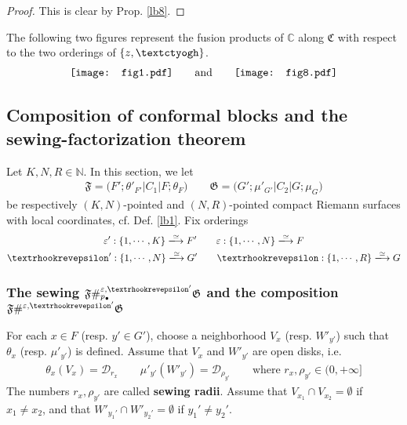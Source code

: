 \documentclass[11pt,b5paper,notitlepage]{article}
\theoremstyle{definition}
\theoremstyle{plain}
\newcommand{\blt}{\bullet}
\newcommand{\Cbb}{\mathbb C}
\newcommand{\Nbb}{\mathbb N}
\newcommand{\<}{\left\langle}
\renewcommand{\>}{\right\rangle}
\newcommand{\MD}{\mathcal{D}}
\newcommand{\fc}{\mathfrak{C}}
\newcommand{\eps}{\varepsilon}
\newcommand{\ff}{\mathfrak{F}}
\newcommand{\fg}{\mathfrak{G}}
\newcommand{\tipaz}{\text{\textctyogh}}
\newcommand{\tipae}{\text{\textrhookrevepsilon}}
\numberwithin{equation}{section}
\begin{document}
\begin{proof}
This is clear by Prop. \ref{lb8}.
\end{proof}


The following two figures represent the fusion products of $\Cbb$ along $\fc$ with respect to the two orderings of $\{z,\tipaz\}$.
\begin{align}\label{eq29}
\vcenter{\hbox{{\texttt{[image: fig1.pdf]}}}}
\qquad\text{and}\qquad
\vcenter{\hbox{{\texttt{[image: fig8.pdf]}}}}
\end{align}


\subsection{Composition of conformal blocks and the sewing-factorization theorem}\label{lb76}

Let $K,N,R\in\Nbb$. In this section, we let 
\begin{gather*}
\ff=\big(F'; \theta'_{F'}\big|C_1\big|F;\theta_F\big)\qquad
\fg=\big(G';\mu'_{G'}\big|C_2\big| G;\mu_G \big)
    \end{gather*}
be respectively $(K,N)$-pointed and $(N,R)$-pointed compact Riemann surfaces with local coordinates, cf. Def. \ref{lb1}. 
Fix orderings
	\begin{gather*}
\eps':\{1,\cdots,K\}\xlongrightarrow{\simeq}F'\qquad	\eps:\{1,\cdots,N\}\xlongrightarrow{\simeq}F\\ \tipae':\{1,\cdots,N\}\xlongrightarrow{\simeq}G'\qquad \tipae:\{1,\cdots,R\}\xlongrightarrow{\simeq}G
	\end{gather*}



\subsubsection{The sewing $\ff\#^{\eps,\tipae'}_{p_\blt}\fg$ and the composition $\ff\#^{\eps,\tipae'}\fg$}\label{lb46}


For each $x\in F$ (resp. $y'\in G'$), choose a neighborhood $V_x$ (resp. $W'_{y'}$) such that $\theta_x$ (resp. $\mu'_{y'}$) is defined. Assume that $V_x$ and $W'_{y'}$ are open disks, i.e.
\begin{align}
\theta_x(V_x)=\MD_{r_x}\qquad \mu'_{y'}(W'_{y'})=\MD_{\rho_{y'}}\qquad\text{where }r_x,\rho_{y'}\in(0,+\infty]
\end{align} 
The numbers $r_x,\rho_{y'}$ are called \textbf{sewing radii}. Assume that $V_{x_1}\cap V_{x_2}=\emptyset$ if $x_1\neq x_2$, and that $W'_{y_1'}\cap W'_{y_2'}=\emptyset$ if $y_1'\neq y_2'$.
\end{document}
